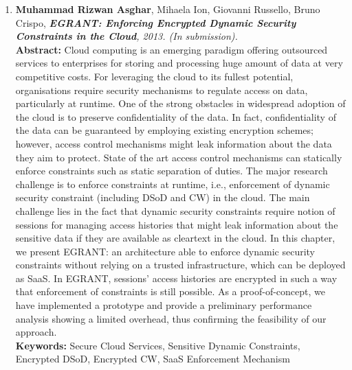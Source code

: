 \documentclass[epsfig,a4paper,11pt,titlepage]{book}
\numberwithin{algorithm}{chapter}
\begin{document}
\begin{enumerate}
  \item \textbf{Muhammad Rizwan Asghar}, Mihaela Ion, Giovanni Russello, Bruno Crispo, \textit{\textbf{\gls{EGRANT}: Enforcing Encrypted Dynamic Security Constraints in the Cloud}, 2013. (In submission).} \vspace{3mm} \\
\textbf{Abstract:} Cloud computing is an emerging paradigm offering outsourced services to enterprises for storing and processing huge amount of data at very competitive costs. For leveraging the cloud to its fullest potential, organisations require security mechanisms to regulate access on data, particularly at runtime. One of the strong obstacles in widespread adoption of the cloud is to preserve confidentiality of the data. In fact, confidentiality of the data can be guaranteed by employing existing encryption schemes; however, access control mechanisms might leak information about the data they aim to protect. State of the art access control mechanisms can statically enforce constraints such as static separation of duties. The major research challenge is to enforce constraints at runtime, i.e., enforcement of dynamic security constraint (including \acrlong{DSoD} and \acrlong{CW}) in the cloud. The main challenge lies in the fact that dynamic security constraints require notion of sessions for managing access histories that might leak information about the sensitive data if they are available as cleartext in the cloud. In this chapter, we present \gls{EGRANT}: an architecture able to enforce dynamic security constraints without relying on a trusted infrastructure, which can be deployed as \gls{SaaS}. In \gls{EGRANT}, sessions' access histories are encrypted in such a way that enforcement of constraints is still possible. As a proof-of-concept, we have implemented a prototype and provide a preliminary performance analysis showing a limited overhead, thus confirming the feasibility of our approach. \vspace{3mm} \\
\textbf{Keywords:} Secure Cloud Services, Sensitive Dynamic Constraints, Encrypted \gls{DSoD},  Encrypted \acrlong{CW}, \acrshort{SaaS} Enforcement Mechanism
  
\end{enumerate}

  
\end{document}

